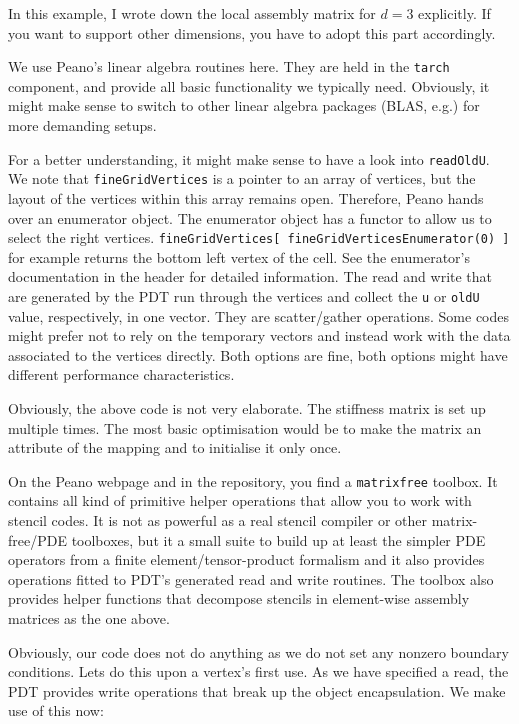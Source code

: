 \noindent
In this example, I wrote down the local assembly matrix for $d=3$ explicitly.
If you want to support other dimensions, you have to adopt this part
accordingly.

We use Peano's linear algebra routines here.
They are held in the \texttt{tarch} component, and provide all basic
functionality we typically need.
Obviously, it might make sense to switch to other linear algebra packages
(BLAS, e.g.) for more demanding setups.

For a better understanding, it might make sense to have a look into
\texttt{readOldU}.
We note that \texttt{fineGridVertices} is a pointer to an array of vertices, but
the layout of the vertices within this array remains open.
Therefore, Peano hands over an enumerator object. 
The enumerator object has a functor to allow us to select the right vertices.
\texttt{fineGridVertices[ fineGridVerticesEnumerator(0) ]} for example returns
the bottom left vertex of the cell.
See the enumerator's documentation in the header for detailed information.
The read and write that are generated by the PDT run through the vertices and
collect the \texttt{u} or \texttt{oldU} value, respectively, in one vector.
They are scatter/gather operations.
Some codes might prefer not to rely on the temporary vectors and instead work
with the data associated to the vertices directly.
Both options are fine, both options might have different performance
characteristics.

 
Obviously, the above code is not very elaborate. 
The stiffness matrix is set up multiple times.
The most basic optimisation would be to make the matrix an attribute of the
mapping and to initialise it only once.

\begin{remark}
  On the Peano webpage and in the repository, you find a \texttt{matrixfree}
  toolbox. It contains all kind of primitive helper operations that allow you to
  work with stencil codes. It is not as powerful as a real stencil compiler or 
  other matrix-free/PDE toolboxes, but it a small suite to build up at least the
  simpler PDE operators from a finite element/tensor-product formalism and it
  also provides operations fitted to PDT's generated read and write routines. 
The toolbox also provides helper functions that decompose stencils in element-wise
assembly matrices as the one above.
\end{remark}


\noindent
Obviously, our code does not do anything as we do not set any nonzero boundary
conditions. 
Lets do this upon a vertex's first use. 
As we have specified a read, the PDT provides write operations that break up the
object encapsulation.
We make use of this now:

